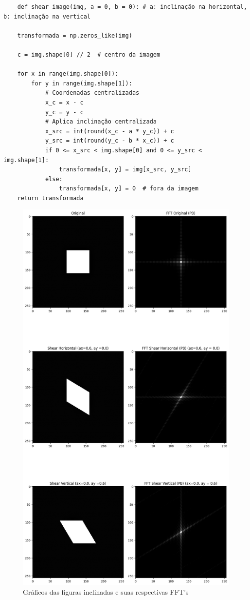 \begin{lstlisting}
    def shear_image(img, a = 0, b = 0): # a: inclinação na horizontal, b: inclinação na vertical

    transformada = np.zeros_like(img)

    c = img.shape[0] // 2  # centro da imagem

    for x in range(img.shape[0]):
        for y in range(img.shape[1]):
            # Coordenadas centralizadas
            x_c = x - c
            y_c = y - c
            # Aplica inclinação centralizada
            x_src = int(round(x_c - a * y_c)) + c
            y_src = int(round(y_c - b * x_c)) + c
            if 0 <= x_src < img.shape[0] and 0 <= y_src < img.shape[1]:
                transformada[x, y] = img[x_src, y_src]
            else:
                transformada[x, y] = 0  # fora da imagem
    return transformada
\end{lstlisting}

\begin{figure}[H]
    \centering
    \includegraphics[width=0.75\linewidth]{figure/shear.png}
    \caption{Gráficos das figuras inclinadas e suas respectivas FFT's}
    \label{fig:placeholder}
\end{figure}


